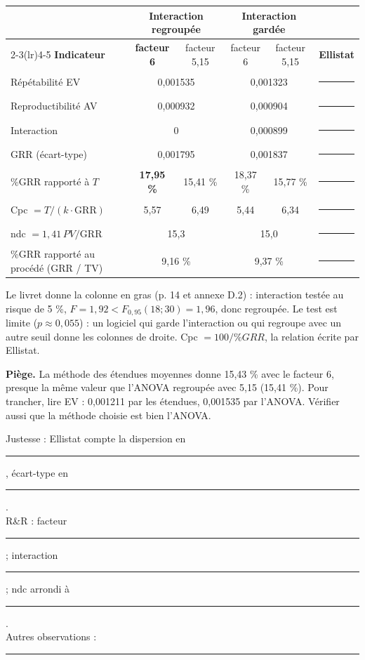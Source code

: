 \documentclass[10pt,a4paper]{article}
\begin{document}
\begin{tabularx}{\linewidth}{@{}X c c c c c@{}}
\toprule
 & \multicolumn{2}{c}{\textbf{Interaction regroupée}} & \multicolumn{2}{c}{\textbf{Interaction gardée}} & \\
\cmidrule(lr){2-3}\cmidrule(lr){4-5}
\textbf{Indicateur} & \textbf{facteur 6} & facteur 5,15 & facteur 6 & facteur 5,15 & \textbf{Ellistat}\\\midrule
Répétabilité EV & \multicolumn{2}{c}{0,001535} & \multicolumn{2}{c}{0,001323} & \rule{16mm}{0.3pt}\\
Reproductibilité AV & \multicolumn{2}{c}{0,000932} & \multicolumn{2}{c}{0,000904} & \rule{16mm}{0.3pt}\\
Interaction & \multicolumn{2}{c}{0} & \multicolumn{2}{c}{0,000899} & \rule{16mm}{0.3pt}\\
GRR (écart-type) & \multicolumn{2}{c}{0,001795} & \multicolumn{2}{c}{0,001837} & \rule{16mm}{0.3pt}\\
\%GRR rapporté à $T$ & \textbf{17,95 \%} & 15,41 \% & 18,37 \% & 15,77 \% & \rule{16mm}{0.3pt}\\
Cpc $= T / (k\cdot\text{GRR})$ & 5,57 & 6,49 & 5,44 & 6,34 & \rule{16mm}{0.3pt}\\
ndc $= 1{,}41\,PV/\text{GRR}$ & \multicolumn{2}{c}{15,3} & \multicolumn{2}{c}{15,0} & \rule{16mm}{0.3pt}\\
\%GRR rapporté au procédé (GRR / TV) & \multicolumn{2}{c}{9,16 \%} & \multicolumn{2}{c}{9,37 \%} & \rule{16mm}{0.3pt}\\
\bottomrule
\end{tabularx}
{\small Le livret donne la colonne en gras (p. 14 et annexe D.2) : interaction testée au risque de 5 \%, $F = 1{,}92 < F_{0{,}95}(18 ; 30) = 1{,}96$, donc regroupée. Le test est limite ($p \approx 0{,}055$) : un logiciel qui garde l'interaction ou qui regroupe avec un autre seuil donne les colonnes de droite. Cpc $= 100 / \%GRR$, la relation écrite par Ellistat.}

\begin{tcolorbox}[boite]
\textbf{Piège.} La méthode des étendues moyennes donne 15,43 \% avec le facteur 6, presque la même valeur que l'ANOVA regroupée avec 5,15 (15,41 \%). Pour trancher, lire EV : 0,001211 par les étendues, 0,001535 par l'ANOVA. Vérifier aussi que la méthode choisie est bien l'ANOVA.
\end{tcolorbox}

Justesse : Ellistat compte la dispersion en \rule{20mm}{0.3pt}, écart-type en \rule{12mm}{0.3pt}.\\[3pt]
R\&R : facteur \rule{12mm}{0.3pt} ; interaction \rule{25mm}{0.3pt} ; ndc arrondi à \rule{10mm}{0.3pt}.\\[3pt]
Autres observations : \rule{0.72\linewidth}{0.3pt}
\end{document}
